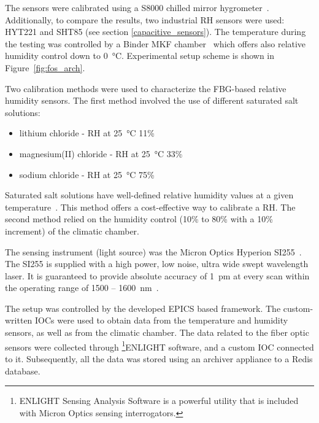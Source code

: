 The sensors were calibrated using a S8000 chilled mirror hygrometer~\cite{michell_s8000}. Additionally, to compare the results, two industrial \gls{RH} sensors were used: HYT221 and SHT85 (see section \ref{capacitive_sensors}). The temperature during the testing was controlled by a Binder MKF chamber~\cite{binder} which offers also relative humidity control down to \SI{0}{\celsius}. Experimental setup scheme is shown in Figure~\ref{fig:fos_arch}. 

Two calibration methods were used to characterize the \gls{FBG}-based relative humidity sensors. The first method involved the use of different saturated salt solutions:
\begin{itemize}
    \item lithium chloride - \gls{RH} at \SI{25}{\celsius} 11\%
    \item magnesium(II) chloride - \gls{RH} at \SI{25}{\celsius} 33\%
    \item sodium chloride - \gls{RH} at \SI{25}{\celsius} 75\%
\end{itemize}
 Saturated salt solutions have well-defined relative humidity values at a given temperature~\cite{Fossa:687857}. This method offers a cost-effective way to calibrate a \gls{RH}. The second method relied on the humidity control (10\% to 80\% with a 10\% increment) of the climatic chamber.
 
 The sensing instrument (light source) was the Micron Optics Hyperion SI255~\cite{si255}. The SI255 is supplied with a high power, low noise, ultra wide swept wavelength laser. It is guaranteed to provide absolute accuracy of 1~pm at every scan within the operating range of 1500 -- 1600~nm~\cite{si255}.

The setup was controlled by the developed \gls{EPICS} based framework. The custom-written \glspl{IOC} were used to obtain data from the temperature and humidity sensors, as well as from the climatic chamber. The data related to the fiber optic sensors were collected through \footnote{ENLIGHT Sensing Analysis Software is a powerful utility that is included with Micron
Optics sensing interrogators.}{ENLIGHT} software, and a custom \gls{IOC} connected to it. Subsequently, all the data was stored using an archiver appliance to a Redis database. 

